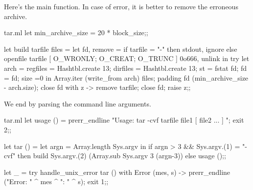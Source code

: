\begin{answer}
Here's the main function. In case of error, it is better to remove the
erroneous archive.
%
\begin{listingcodefile}{tar.ml}
let min_archive_size = 20 * block_size;;

let build tarfile files =
  let fd, remove = 
    if tarfile = "-" then stdout, ignore
    else openfile tarfile [ O_WRONLY; O_CREAT; O_TRUNC ] 0o666, unlink in
  try 
    let arch = 
         { regfiles = Hashtbl.create 13; dirfiles = Hashtbl.create 13; 
           st = fstat fd; fd = fd; size =0 } in
    Array.iter (write_from arch) files; 
    padding fd (min_archive_size - arch.size);
    close fd
  with z -> 
    remove tarfile; close fd; raise z;;
\end{listingcodefile}
%
We end by parsing the command line arguments. 
%
\begin{listingcodefile}{tar.ml}
let usage () = 
  prerr_endline "Usage: tar -cvf tarfile file1 [ file2 ... ] ";
  exit 2;;

let tar () =
  let argn = Array.length Sys.argv in
  if argn > 3 && Sys.argv.(1) = "-cvf" then
    build Sys.argv.(2) (Array.sub Sys.argv 3 (argn-3))
  else usage ();;

let _ = 
  try handle_unix_error tar () 
  with Error (mes, s) -> 
    prerr_endline ("Error: " ^ mes ^ ": " ^ s); exit 1;;
\end{listingcodefile}
\end{answer}
